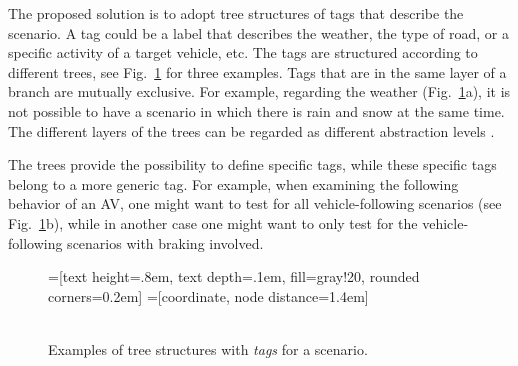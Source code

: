 The proposed solution is to adopt tree structures of tags that describe the scenario. A tag could be a label that describes the weather, the type of road, or a specific activity of a target vehicle, etc. The tags are structured according to different trees, see Fig.~\ref{fig:tag trees} for three examples. Tags that are in the same layer of a branch are mutually exclusive. For example, regarding the weather (Fig.~\ref{fig:tag trees}a), it is not possible to have a scenario in which there is rain and snow at the same time. The different layers of the trees can be regarded as different abstraction levels \cite{Bonnin2014}. 

The trees provide the possibility to define specific tags, while these specific tags belong to a more generic tag. For example, when examining the following behavior of an AV, one might want to test for all vehicle-following scenarios (see Fig.~\ref{fig:tag trees}b), while in another case one might want to only test for the vehicle-following scenarios with braking involved.


\begin{figure}
	\centering
	=[text height=.8em, text depth=.1em, fill=gray!20, rounded corners=0.2em]
	=[coordinate, node distance=1.4em]
	 \\
	\\
	\caption{Examples of tree structures with \emph{tags} for a scenario.}
	\label{fig:tag trees}
	\spaceaftercaption
\end{figure}
